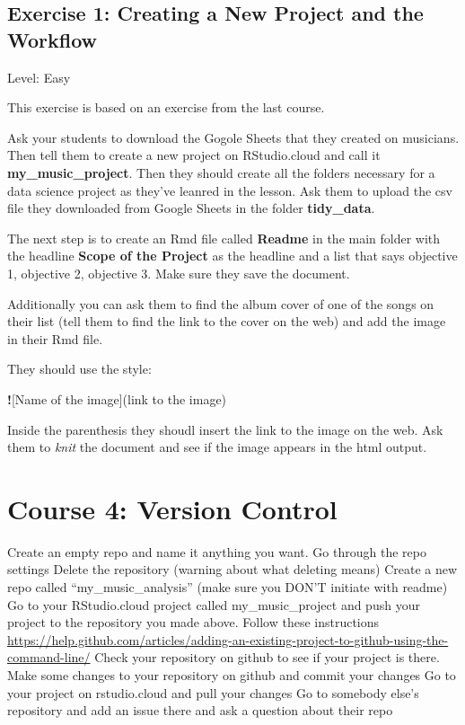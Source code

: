 \documentclass[]{book}
\newenvironment{Shaded}{\begin{snugshade}}{\end{snugshade}}
\newcommand{\NormalTok}[1]{#1}
\newcommand{\OperatorTok}[1]{\textcolor[rgb]{0.81,0.36,0.00}{\textbf{#1}}}
\begin{document}
\hypertarget{exercise-1-creating-a-new-project-and-the-workflow}{%
\section*{Exercise 1: Creating a New Project and the Workflow}\label{exercise-1-creating-a-new-project-and-the-workflow}}

Level: Easy

This exercise is based on an exercise from the last course.

Ask your students to download the Gogole Sheets that they created on musicians. Then tell them to create a new project on RStudio.cloud and call it \textbf{my\_music\_project}. Then they should create all the folders necessary for a data science project as they've leanred in the lesson. Ask them to upload the csv file they downloaded from Google Sheets in the folder \textbf{tidy\_data}.

The next step is to create an Rmd file called \textbf{Readme} in the main folder with the headline \textbf{Scope of the Project} as the headline and a list that says objective 1, objective 2, objective 3. Make sure they save the document.

Additionally you can ask them to find the album cover of one of the songs on their list (tell them to find the link to the cover on the web) and add the image in their Rmd file.

They should use the style:

\begin{Shaded}
\begin{Highlighting}[]
\OperatorTok{!}\NormalTok{[Name of the image](link to the image)}
\end{Highlighting}
\end{Shaded}

Inside the parenthesis they shoudl insert the link to the image on the web. Ask them to \emph{knit} the document and see if the image appears in the html output.

\hypertarget{version-control}{%
\chapter*{Course 4: Version Control}\label{version-control}}

Create an empty repo and name it anything you want.
Go through the repo settings
Delete the repository (warning about what deleting means)
Create a new repo called ``my\_music\_analysis'' (make sure you DON'T initiate with readme)
Go to your RStudio.cloud project called my\_music\_project and push your project to the repository you made above. Follow these instructions \url{https://help.github.com/articles/adding-an-existing-project-to-github-using-the-command-line/}
Check your repository on github to see if your project is there.
Make some changes to your repository on github and commit your changes
Go to your project on rstudio.cloud and pull your changes
Go to somebody else's repository and add an issue there and ask a question about their repo
\end{document}
